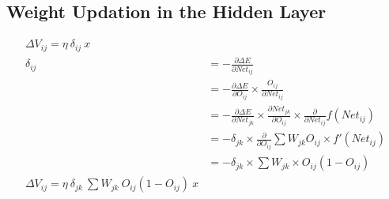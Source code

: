 \subsection{Weight  Updation in the Hidden Layer}
\begin{align*}
\Delta V_{ij} = \eta~\delta_{ij}~x \\
\delta_{ij} &= - \frac{\partial \Delta E}{\partial Net_{ij}} \\
       &= - \frac{\partial \Delta E}{\partial O_{ij}} \times \frac{O_{ij}}{\partial Net_{ij}} \\
       &= - \frac{\partial \Delta E}{\partial Net_{jk}} \times \frac{\partial Net_{jk}}{\partial O_{ij}} \times \frac{\partial}{\partial Net_{ij}} f(Net_{ij}) \\
       &= - \delta_{jk} \times \frac{\partial}{\partial O_{ij}} \sum W_{jk} O_{ij} \times f'(Net_{ij}) \\
       &= - \delta_{jk} \times \sum W_{jk} \times O_{ij}(1-O_{ij}) \\
\Delta V_{ij} = \eta~\delta_{jk} ~ \sum W_{jk} ~ O_{ij}(1-O_{ij})~x
\end{align*}
